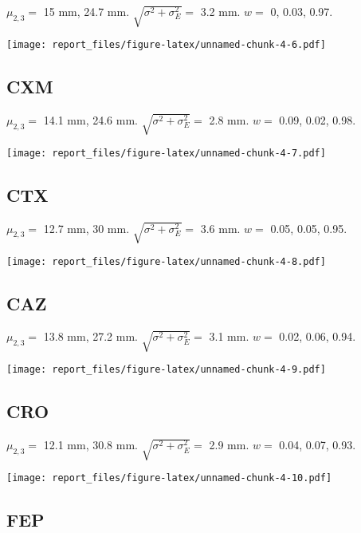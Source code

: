\documentclass[]{article}
\begin{document}
\(\mu_{2,3}=\) 15 mm, 24.7 mm. \(\sqrt{\sigma^2+\sigma_E^2}=\) 3.2 mm.
\(w=\) 0, 0.03, 0.97.

\texttt{[image: report\_files/figure-latex/unnamed-chunk-4-6.pdf]}

\pagebreak

\subsection{CXM}\label{cxm}

\(\mu_{2,3}=\) 14.1 mm, 24.6 mm. \(\sqrt{\sigma^2+\sigma_E^2}=\) 2.8 mm.
\(w=\) 0.09, 0.02, 0.98.

\texttt{[image: report\_files/figure-latex/unnamed-chunk-4-7.pdf]}

\pagebreak

\subsection{CTX}\label{ctx}

\(\mu_{2,3}=\) 12.7 mm, 30 mm. \(\sqrt{\sigma^2+\sigma_E^2}=\) 3.6 mm.
\(w=\) 0.05, 0.05, 0.95.

\texttt{[image: report\_files/figure-latex/unnamed-chunk-4-8.pdf]}

\pagebreak

\subsection{CAZ}\label{caz}

\(\mu_{2,3}=\) 13.8 mm, 27.2 mm. \(\sqrt{\sigma^2+\sigma_E^2}=\) 3.1 mm.
\(w=\) 0.02, 0.06, 0.94.

\texttt{[image: report\_files/figure-latex/unnamed-chunk-4-9.pdf]}

\pagebreak

\subsection{CRO}\label{cro}

\(\mu_{2,3}=\) 12.1 mm, 30.8 mm. \(\sqrt{\sigma^2+\sigma_E^2}=\) 2.9 mm.
\(w=\) 0.04, 0.07, 0.93.

\texttt{[image: report\_files/figure-latex/unnamed-chunk-4-10.pdf]}

\pagebreak

\subsection{FEP}\label{fep}
\end{document}
